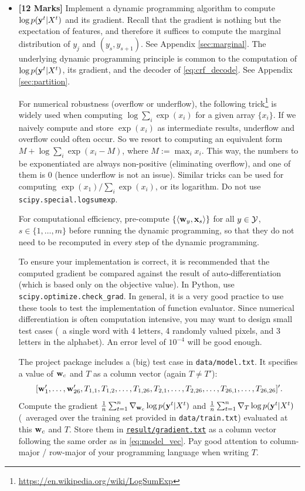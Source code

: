 \documentclass[11pt]{report}
\begin{document}
\begin{itemize}
	\item[(2a)] {\bf [12 Marks]} Implement a dynamic programming algorithm to compute $\log p(\mathbf{\boldsymbol{y}}^t | X^t)$ and its gradient.  Recall that the gradient is nothing but the expectation of features, and therefore it suffices to compute the marginal distribution of $y_j$ and $(y_s, y_{s+1})$. See Appendix \ref{sec:marginal}.
	The underlying dynamic programming principle is common to the computation of $\log p(\mathbf{\boldsymbol{y}}^t | X^t)$, its gradient, and the decoder of \eqref{eq:crf_decode}.
	See Appendix \ref{sec:partition}.
	
	For numerical robustness (overflow or underflow), the following trick\footnote{\href{https://en.wikipedia.org/wiki/LogSumExp}{\url{https://en.wikipedia.org/wiki/LogSumExp}}} is widely used when computing $\log \sum_i \exp(x_i)$ for a given array $\{x_i\}$.  If we naively compute and store $\exp(x_i)$ as intermediate results, underflow and overflow could often occur.  So we resort to computing an equivalent form $M + \log \sum_i \exp(x_i - M)$, where $M := \max_i x_i$.  This way, the numbers to be exponentiated are always non-positive (eliminating overflow), and one of them is 0 (hence underflow is not an issue).  Similar tricks can be used for computing $\exp(x_1) / \sum_i \exp(x_i)$, or its logarithm.
	Do not use \verb#scipy.special.logsumexp#.
	
	For computational efficiency, pre-compute $\{\left\langle \mathbf{\boldsymbol{w}}_y,\mathbf{\boldsymbol{x}}_s \right\rangle\}$ for all $y \in \mathcal{Y}$, $s \in \{1, \ldots, m\}$ before running the dynamic programming,
	so that they do not need to be recomputed in every step of the dynamic programming.
	
	To ensure your implementation is correct, it is recommended that the computed gradient be compared against the result of auto-differentiation (which is based only on the objective value).
	In Python, use \verb#scipy.optimize.check_grad#.	
	In general, it is a very good practice to use these tools to test the implementation of function evaluator.
	Since numerical differentiation is often computation intensive, you may want to design small test cases (\eg\ a single word with 4 letters, 4 randomly valued pixels, and 3 letters in the alphabet).
	An error level of $10^{-4}$ will be good enough.
	
	The project package includes a (big) test case in \verb#data/model.txt#.
	It specifies a value of $\mathbf{\boldsymbol{w}}_c$ and $T$ as a column vector (again $T \neq T'$):
	\begin{align}
		\label{eq:model_vec}
		[\mathbf{\boldsymbol{w}}'_1, \ldots, \mathbf{\boldsymbol{w}}'_{26}, T_{1,1}, T_{1,2}, \ldots, T_{1, 26}, T_{2,1}, \ldots, T_{2, 26}, \ldots, T_{26,1}, \ldots, T_{26, 26}]'.
	\end{align}
	Compute the gradient $\frac{1}{n} \sum_{t=1}^n {\nabla}_{\mathbf{\boldsymbol{w}}_c} \log p(\mathbf{\boldsymbol{y}}^t | X^t)$ and
	$\frac{1}{n} \sum_{t=1}^n {\nabla}_{T} \log p(\mathbf{\boldsymbol{y}}^t | X^t)$
	(\ie\ averaged over the training set provided in \verb#data/train.txt#) evaluated at this $\mathbf{\boldsymbol{w}}_c$ and $T$.
	Store them in \underline{\texttt{result/gradient.txt}} as a column vector following the same order as in \eqref{eq:model_vec}.
	Pay good attention to column-major / row-major of your programming language when writing $T$.
	

\end{itemize}
\end{document}
